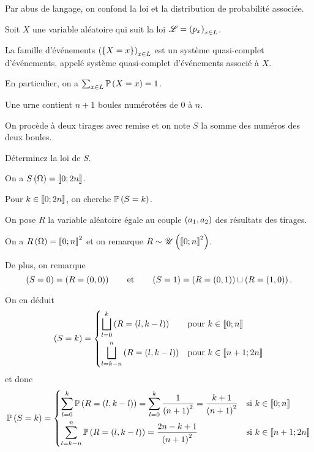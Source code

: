 Par abus de langage, on confond la loi et la distribution de probabilité associée.

\begin{prop}
Soit \(X\) une variable aléatoire qui suit la loi \(\mathscr{L}=\left(p_x\right)_{x\in L}\).

La famille d'événements \(\left(\left\lbrace X=x\right\rbrace\right)_{x\in L}\) est un système quasi-complet d'événements, appelé système quasi-complet d'événements associé à \(X\).

En particulier, on a \(\sum_{x\in L}\mathbb{P}\left(X=x\right)=1\).
\end{prop}

\begin{exo}
Une urne contient \(n+1\) boules numérotées de \(0\) à \(n\).

On procède à deux tirages avec remise et on note \(S\) la somme des numéros des deux boules.

Déterminez la loi de \(S\).
\end{exo}

\begin{corr}
On a \(S\left(\Omega\right)=\left\llbracket0;2n\right\rrbracket\).

Pour \(k\in\left\llbracket0;2n\right\rrbracket\), on cherche \(\mathbb{P}\left(S=k\right)\).

On pose \(R\) la variable aléatoire égale au couple \(\left(a_1,a_2\right)\) des résultats des tirages.

On a \(R\left(\Omega\right)=\left\llbracket0;n\right\rrbracket^2\) et on remarque \(R\sim\mathscr{U}\left(\left\llbracket0;n\right\rrbracket^2\right)\).

De plus, on remarque \[\left(S=0\right)=\left(R=\left(0,0\right)\right)\qquad\text{et}\qquad\left(S=1\right)=\left(R=\left(0,1\right)\right)\sqcup\left(R=\left(1,0\right)\right).\]

On en déduit \[\left(S=k\right)=\begin{dcases}
\bigsqcup_{l=0}^k\left(R=\left(l,k-l\right)\right) &\text{pour }k\in\left\llbracket0;n\right\rrbracket \\
\bigsqcup_{l=k-n}^n\left(R=\left(l,k-l\right)\right) &\text{pour }k\in\left\llbracket n+1;2n\right\rrbracket
\end{dcases}\] et donc \[\mathbb{P}\left(S=k\right)=\begin{dcases}
\sum_{l=0}^k\mathbb{P}\left(R=\left(l,k-l\right)\right)=\sum_{l=0}^k\dfrac{1}{\left(n+1\right)^2}=\dfrac{k+1}{\left(n+1\right)^2} &\text{si }k\in\left\llbracket0;n\right\rrbracket \\
\sum_{l=k-n}^n\mathbb{P}\left(R=\left(l,k-l\right)\right)=\dfrac{2n-k+1}{\left(n+1\right)^2} &\text{si }k\in\left\llbracket n+1;2n\right\rrbracket
\end{dcases}\]
\end{corr}

